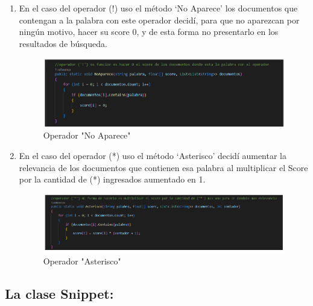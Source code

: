 \documentclass[a4paper,12pt]{article}
\begin{document}
    \renewcommand{\labelenumi}{$\bigstar$}
    \begin{enumerate}
    	
    \item En el caso del operador (!) uso el método ‘No Aparece’ los documentos que contengan a la palabra con este operador decidí, para que no aparezcan por ningún motivo, hacer su score 0, y de esta forma no presentarlo en los resultados de búsqueda.\\
    
    \begin{figure}[h]
    	\centering
    	\includegraphics[width=13cm]{operador1.png}
    	\caption{Operador "No Aparece"}
    \end{figure}
    
    \item En el caso del operador (*) uso el método ‘Asterisco’ decidí aumentar la relevancia de los documentos que contienen esa palabra al multiplicar el Score por la cantidad de (*) ingresados aumentado en 1.\\
    
    \begin{figure}[h]
    	\centering
    	\includegraphics[width=13cm]{operador2.png}
    	\caption{Operador "Asterisco"}
    \end{figure}
    
    \end{enumerate}
    
    
    \subsection{La clase Snippet:}
    
\end{document}
